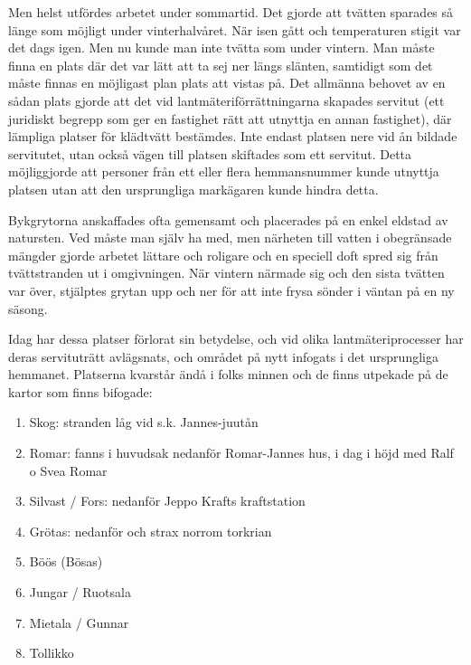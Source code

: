 Men helst utfördes arbetet under sommartid. Det gjorde att tvätten sparades så länge som möjligt under vinterhalvåret. När isen gått och temperaturen stigit var det dags igen. Men nu kunde man inte tvätta som under vintern. Man måste finna en plats där det var lätt att ta sej ner längs slänten, samtidigt som det måste finnas en möjligast plan plats att vistas på. Det allmänna behovet av en sådan plats gjorde att det vid lantmäteriförrättningarna skapades servitut (ett juridiskt begrepp som ger en fastighet rätt att utnyttja en annan fastighet), där lämpliga platser för klädtvätt bestämdes. Inte endast platsen nere vid ån bildade servitutet, utan också vägen till platsen skiftades som ett servitut. Detta möjliggjorde att personer från ett eller flera hemmansnummer kunde utnyttja platsen utan att den ursprungliga markägaren kunde hindra detta.

Bykgrytorna anskaffades ofta gemensamt och placerades på en enkel eldstad av natursten. Ved måste man själv ha med, men närheten till vatten i obegränsade mängder gjorde arbetet lättare och roligare och en speciell doft spred sig från tvättstranden ut i omgivningen. När vintern närmade sig och den sista tvätten var över, stjälptes grytan upp och ner för att inte frysa sönder i väntan på en ny säsong.

Idag har dessa platser förlorat sin betydelse, och vid olika lantmäteriprocesser har deras servituträtt avlägsnats, och området på nytt infogats i det ursprungliga hemmanet. Platserna kvarstår ändå i folks minnen och de finns utpekade på de kartor som finns bifogade:
\begin{enumerate}
  \item Skog: stranden låg vid s.k. Jannes-juutån
  \item Romar: fanns i huvudsak nedanför Romar-Jannes hus, i dag i höjd med Ralf o Svea Romar
  \item Silvast / Fors: nedanför Jeppo Krafts kraftstation
  \item Grötas: nedanför och strax norrom torkrian
  \item Böös (Bösas)
  \item Jungar / Ruotsala
  \item Mietala / Gunnar
  \item Tollikko
\end{enumerate}

